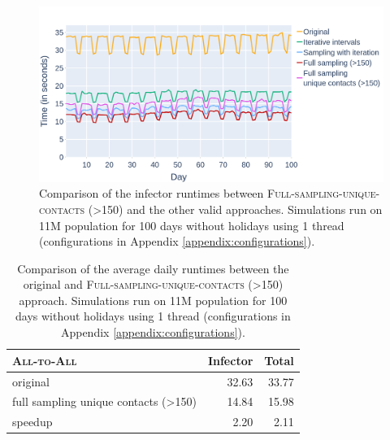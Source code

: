 \begin{figure}
    \centering
    \includegraphics[width=\textwidth]{4 - Sampling/fig/full_sampling_unique_contacts/fsuc_pSize_vs_rest_infector.png}
    \caption{Comparison of the infector runtimes between \textsc{Full-sampling-unique-contacts (>150)} and the other valid approaches. Simulations run on 11M population for 100 days without holidays using 1 thread (configurations in Appendix \ref{appendix:configurations}).}
    \label{fig:fsuc_pSize_vs_rest_infector}
\end{figure}

\begin{table}
    \centering
    \begin{tabular}{@{}lrr@{}}
        \toprule
        \textsc{All-to-All} & Infector & Total \\ \midrule
        original & 32.63 & 33.77 \\
        full sampling unique contacts (\textgreater{}150) & 14.84 & 15.98 \\  \hdashline[1pt/1pt]
        speedup & 2.20 & 2.11 \\ \bottomrule
    \end{tabular}
    \caption{Comparison of the average daily runtimes between the original and \textsc{Full-sampling-unique-contacts} (\textgreater{}150) approach. Simulations run on 11M population for 100 days without holidays using 1 thread (configurations in Appendix \ref{appendix:configurations}).}
    \label{tab:fsuc_pSize_vs_standard_runtimes}
\end{table}

